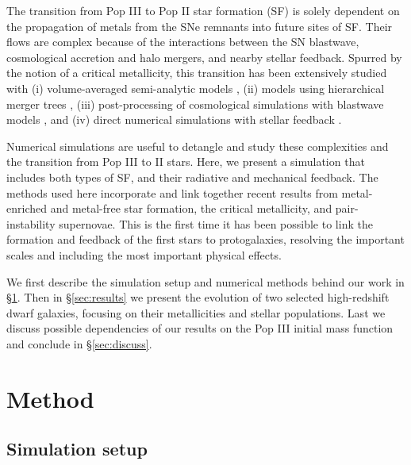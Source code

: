 \documentclass[apjl]{emulateapj}
\begin{document}
The transition from Pop III to Pop II star formation (SF) is solely
dependent on the propagation of metals from the SNe remnants into
future sites of SF.  Their flows are complex because of the
interactions between the SN blastwave, cosmological accretion and halo
mergers, and nearby stellar feedback.  Spurred by the notion of a
critical metallicity, this transition has been extensively studied
with (i) volume-averaged semi-analytic models \citep{Scannapieco03,
  Yoshida04, Furlanetto05_Reion}, (ii) models using hierarchical
merger trees \citep{Tumlinson06, Tumlinson10, Salvadori07, Komiya10},
(iii) post-processing of cosmological simulations with blastwave
models \citep{Karlsson08, Trenti09, Trenti10}, and (iv) direct
numerical simulations with stellar feedback \citep{Tornatore07,
  Ricotti08, Maio10_Pop32, Maio10_Enrich}.

Numerical simulations are useful to detangle and study these
complexities and the transition from Pop III to II stars.  Here, we
present a simulation that includes both types of SF, and their
radiative and mechanical feedback.  The methods used here incorporate
and link together recent results from metal-enriched and metal-free
star formation, the critical metallicity, and pair-instability
supernovae.  This is the first time it has been possible to link the
formation and feedback of the first stars to protogalaxies, resolving
the important scales and including the most important physical
effects.

We first describe the simulation setup and numerical methods behind
our work in \S\ref{sec:setup}.  Then in \S\ref{sec:results} we present
the evolution of two selected high-redshift dwarf galaxies, focusing
on their metallicities and stellar populations.  Last we discuss
possible dependencies of our results on the Pop III initial mass
function and conclude in \S\ref{sec:discuss}.

\section{Method}
\label{sec:setup}

\subsection{Simulation setup}
\end{document}
